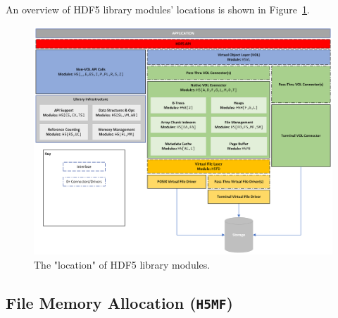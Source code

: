 

An overview of HDF5 library modules' locations is shown in Figure~\ref{fig:module-location}.

\begin{landscape}
\begin{figure}
\centering
\includegraphics[scale=0.74,angle=90]{images/HDF5 library canvas.png}
\caption{The "location" of HDF5 library modules.\label{fig:module-location}}
\end{figure}
\end{landscape}


\subsection{File Memory Allocation (\texttt{H5MF})}


